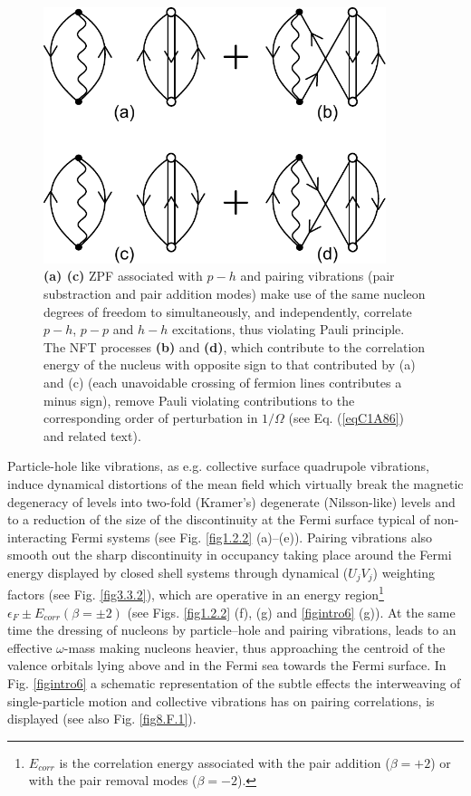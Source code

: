 \begin{figure}
\centerline {
\includegraphics*[width=10cm]{introduccion/figs/figintroF2}
}
\caption{\textbf{(a) (c)} ZPF associated with $p-h$ and pairing vibrations (pair substraction and pair addition modes) make use of the same nucleon degrees of freedom to simultaneously, and independently, correlate  $p-h$, $p-p$ and $h-h$ excitations, thus violating Pauli principle. The NFT processes \textbf{(b)} and \textbf{(d)}, which contribute to the correlation energy of the nucleus with opposite sign to that contributed by (a) and (c) (each unavoidable crossing of fermion lines contributes  a minus sign), remove Pauli violating contributions to the corresponding order of perturbation in $1/\Omega$ (see Eq. (\ref{eqC1A86}) and related text).}
\label{figintroF2}
\end{figure}
Particle-hole like vibrations, as e.g. collective surface quadrupole vibrations, induce dynamical distortions of the mean field which virtually break the  magnetic degeneracy of levels into two-fold (Kramer's) degenerate (Nilsson-like) levels and to a reduction of the size of the discontinuity at the Fermi surface typical of non-interacting Fermi systems (see Fig. \ref{fig1.2.2} (a)--(e)). Pairing vibrations also smooth out the sharp discontinuity in occupancy taking place around the Fermi energy  displayed by closed shell systems through dynamical ($U_jV_j$) weighting factors (see Fig. \ref{fig3.3.2}), which are operative in an energy region\footnote{$E_{corr}$ is the correlation energy associated with the pair addition ($\beta=+2$) or with the pair removal modes ($\beta=-2$).}  $\epsilon_F\pm E_{corr}(\beta=\pm2)$ (see Figs. \ref{fig1.2.2} (f), (g) and \ref{figintro6} (g)). At the same time the dressing of nucleons by particle--hole and pairing vibrations, leads to an effective $\omega$-mass making nucleons heavier, thus approaching the centroid of the valence orbitals lying above and in the Fermi sea towards the Fermi surface.  In Fig. \ref{figintro6} a schematic representation of the subtle effects the interweaving of single-particle motion and collective vibrations has on pairing correlations, is displayed (see also Fig. \ref{fig8.F.1}). 

